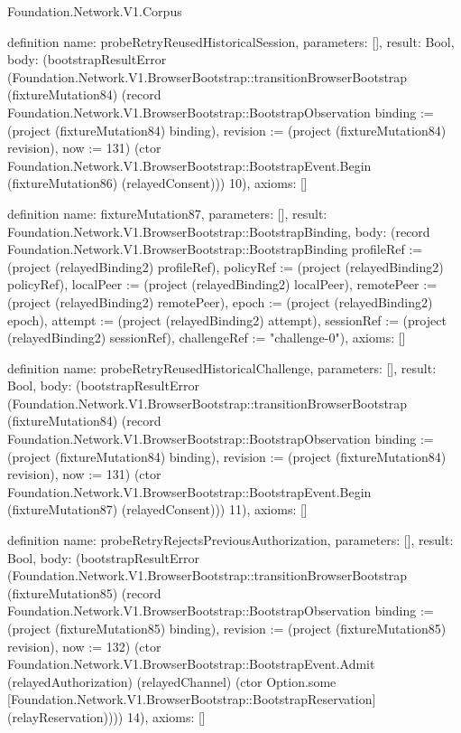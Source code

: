 \begin{lexlean}{Foundation.Network.V1.Corpus}
\begin{semanticmodule}
definition{
  name: probeRetryReusedHistoricalSession,
  parameters: [],
  result: Bool,
  body: (bootstrapResultError (Foundation.Network.V1.BrowserBootstrap::transitionBrowserBootstrap (fixtureMutation84) (record Foundation.Network.V1.BrowserBootstrap::BootstrapObservation {binding := (project (fixtureMutation84) binding), revision := (project (fixtureMutation84) revision), now := 131}) (ctor Foundation.Network.V1.BrowserBootstrap::BootstrapEvent.Begin (fixtureMutation86) (relayedConsent))) 10),
  axioms: []
}

definition{
  name: fixtureMutation87,
  parameters: [],
  result: Foundation.Network.V1.BrowserBootstrap::BootstrapBinding,
  body: (record Foundation.Network.V1.BrowserBootstrap::BootstrapBinding {profileRef := (project (relayedBinding2) profileRef), policyRef := (project (relayedBinding2) policyRef), localPeer := (project (relayedBinding2) localPeer), remotePeer := (project (relayedBinding2) remotePeer), epoch := (project (relayedBinding2) epoch), attempt := (project (relayedBinding2) attempt), sessionRef := (project (relayedBinding2) sessionRef), challengeRef := "challenge-0"}),
  axioms: []
}

definition{
  name: probeRetryReusedHistoricalChallenge,
  parameters: [],
  result: Bool,
  body: (bootstrapResultError (Foundation.Network.V1.BrowserBootstrap::transitionBrowserBootstrap (fixtureMutation84) (record Foundation.Network.V1.BrowserBootstrap::BootstrapObservation {binding := (project (fixtureMutation84) binding), revision := (project (fixtureMutation84) revision), now := 131}) (ctor Foundation.Network.V1.BrowserBootstrap::BootstrapEvent.Begin (fixtureMutation87) (relayedConsent))) 11),
  axioms: []
}

definition{
  name: probeRetryRejectsPreviousAuthorization,
  parameters: [],
  result: Bool,
  body: (bootstrapResultError (Foundation.Network.V1.BrowserBootstrap::transitionBrowserBootstrap (fixtureMutation85) (record Foundation.Network.V1.BrowserBootstrap::BootstrapObservation {binding := (project (fixtureMutation85) binding), revision := (project (fixtureMutation85) revision), now := 132}) (ctor Foundation.Network.V1.BrowserBootstrap::BootstrapEvent.Admit (relayedAuthorization) (relayedChannel) (ctor Option.some [Foundation.Network.V1.BrowserBootstrap::BootstrapReservation] (relayReservation)))) 14),
  axioms: []
}


\end{semanticmodule}
\end{lexlean}
